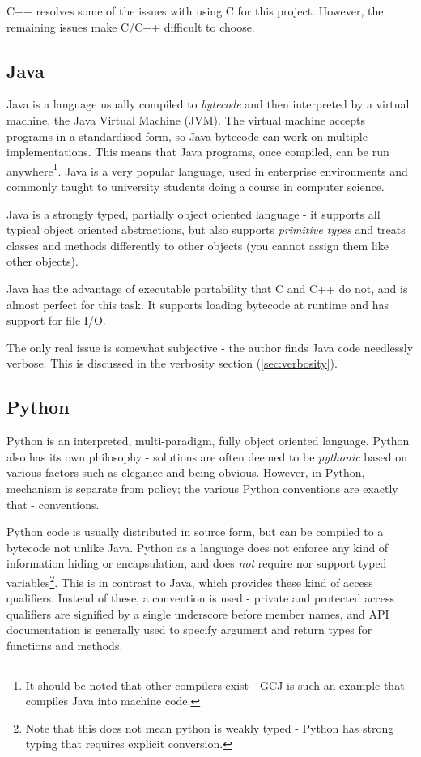 \documentclass[10pt,a4paper,notitlepage]{report}
\begin{document}
C++ resolves some of the issues with using C for this project. However, the remaining issues make C/C++ difficult to choose.

\subsection{Java}
Java is a language usually compiled to \emph{bytecode} and then interpreted by a virtual machine, the Java Virtual Machine (JVM). The virtual machine accepts programs in a standardised form, so Java bytecode can work on multiple implementations. This means that Java programs, once compiled, can be run anywhere\footnote{It should be noted that other compilers exist - GCJ\cite{gcj} is such an example that compiles Java into machine code.}. Java is a very popular language\cite{javatech}, used in enterprise environments and commonly taught to university students doing a course in computer science.

Java is a strongly typed, partially object oriented language - it supports all typical object oriented abstractions, but also supports \emph{primitive types} and treats classes and methods differently to other objects (you cannot assign them like other objects).

Java has the advantage of executable portability that C and C++ do not, and is almost perfect for this task. It supports loading bytecode at runtime and has support for file I/O.

The only real issue is somewhat subjective - the author finds Java code needlessly verbose. This is discussed in the verbosity section (\ref{sec:verbosity}).

\subsection{Python}
Python is an interpreted, multi-paradigm, fully object oriented language. Python also has its own philosophy - solutions are often deemed to be \emph{pythonic} based on various factors such as elegance and being obvious. However, in Python, mechanism is separate from policy; the various Python conventions are exactly that - conventions.

Python code is usually distributed in source form, but can be compiled to a bytecode not unlike Java. Python as a language does not enforce any kind of information hiding or encapsulation, and does \emph{not} require nor support typed variables\footnote{Note that this does not mean python is weakly typed -  Python has strong typing that requires explicit conversion.}. This is in contrast to Java, which provides these kind of access qualifiers. Instead of these, a convention is used - private and protected access qualifiers are signified by a single underscore before member names, and API documentation is generally used to specify argument and return types for functions and methods.
\end{document}
